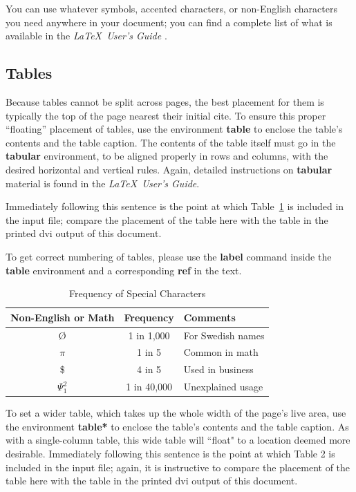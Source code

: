 \documentclass{style/nime-alternate}
\begin{document}
You can use whatever symbols, accented characters, or
non-English characters you need anywhere in your document;
you can find a complete list of what is
available in the \textit{\LaTeX\
User's Guide} \cite{Lamport:LaTeX}.


\subsection{Tables}
Because tables cannot be split across pages, the best
placement for them is typically the top of the page
nearest their initial cite.  To
ensure this proper ``floating'' placement of tables, use the
environment \textbf{table} to enclose the table's contents and
the table caption.  The contents of the table itself must go
in the \textbf{tabular} environment, to
be aligned properly in rows and columns, with the desired
horizontal and vertical rules.  Again, detailed instructions
on \textbf{tabular} material
is found in the \textit{\LaTeX\ User's Guide}.

Immediately following this sentence is the point at which
Table~\ref{tab:frequency} is included in the input file; compare the
placement of the table here with the table in the printed
dvi output of this document. 

To get correct numbering of tables, please use the \textbf{label} command inside the \textbf{table} environment and a corresponding \textbf{ref} in the text.

\begin{table}
\centering
\caption{Frequency of Special Characters}
\begin{tabular}{|c|c|l|} \hline
Non-English or Math&Frequency&Comments\\ \hline
\O & 1 in 1,000& For Swedish names\\ \hline
$\pi$ & 1 in 5& Common in math\\ \hline
\$ & 4 in 5 & Used in business\\ \hline
$\Psi^2_1$ & 1 in 40,000& Unexplained usage\\
\hline\end{tabular}
\label{tab:frequency}
\end{table}

To set a wider table, which takes up the whole width of
the page's live area, use the environment
\textbf{table*} to enclose the table's contents and
the table caption.  As with a single-column table, this wide
table will ``float" to a location deemed more desirable.
Immediately following this sentence is the point at which
Table 2 is included in the input file; again, it is
instructive to compare the placement of the
table here with the table in the printed dvi
output of this document.
\end{document}
